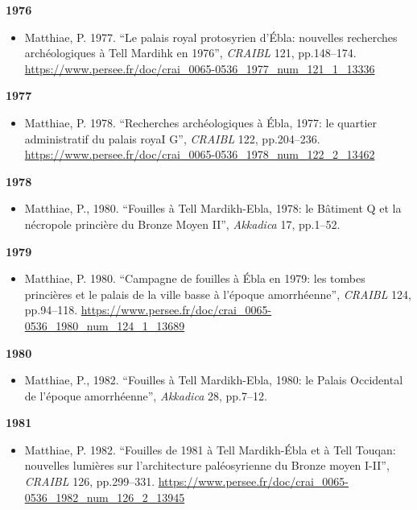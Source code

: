 \documentclass[
]{book}
\providecommand{\tightlist}{%
  \setlength{\itemsep}{0pt}\setlength{\parskip}{0pt}}
\begin{document}
\textbf{1976}

\begin{itemize}
\tightlist
\item
  Matthiae, P. 1977. ``Le palais royal protosyrien d'Ébla: nouvelles recherches archéologiques à Tell Mardihk en 1976'', \emph{CRAIBL} 121, pp.148--174. \url{https://www.persee.fr/doc/crai_0065-0536_1977_num_121_1_13336}
\end{itemize}

\textbf{1977}

\begin{itemize}
\tightlist
\item
  Matthiae, P. 1978. ``Recherches archéologiques à Ébla, 1977: le quartier administratif du palais royaI G'', \emph{CRAIBL} 122, pp.204--236. \url{https://www.persee.fr/doc/crai_0065-0536_1978_num_122_2_13462}
\end{itemize}

\textbf{1978}

\begin{itemize}
\tightlist
\item
  Matthiae, P., 1980. ``Fouilles à Tell Mardikh-Ebla, 1978: le Bâtiment Q et la nécropole princière du Bronze Moyen II'', \emph{Akkadica} 17, pp.1--52.
\end{itemize}

\textbf{1979}

\begin{itemize}
\tightlist
\item
  Matthiae, P. 1980. ``Campagne de fouilles à Ébla en 1979: les tombes princières et le palais de la ville basse à l'époque amorrhéenne'', \emph{CRAIBL} 124, pp.94--118. \url{https://www.persee.fr/doc/crai_0065-0536_1980_num_124_1_13689}
\end{itemize}

\textbf{1980}

\begin{itemize}
\tightlist
\item
  Matthiae, P., 1982. ``Fouilles à Tell Mardikh-Ebla, 1980: le Palais Occidental de l'époque amorrhéenne'', \emph{Akkadica} 28, pp.7--12.
\end{itemize}

\textbf{1981}

\begin{itemize}
\tightlist
\item
  Matthiae, P. 1982. ``Fouilles de 1981 à Tell Mardikh-Ébla et à Tell Touqan: nouvelles lumières sur l'architecture paléosyrienne du Bronze moyen I-II'', \emph{CRAIBL} 126, pp.299--331. \url{https://www.persee.fr/doc/crai_0065-0536_1982_num_126_2_13945}
\end{itemize}
\end{document}
